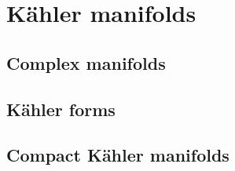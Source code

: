 \section{K\"ahler manifolds}

\subsection{Complex manifolds}

\subsection{K\"ahler forms}

\subsection{Compact K\"ahler manifolds}
